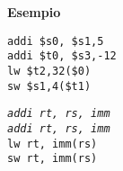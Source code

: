 \documentclass[../main.tex]{subfiles}
\begin{document}
\vspace*{5mm}
\noindent
\textbf{Esempio}
\begin{table}[h!]
    \begin{minipage}{.3\linewidth}
        \texttt{addi \$s0, \$s1,5} \\
        \texttt{addi \$t0, \$s3,-12} \\
        \newline
        \texttt{lw \$t2,32(\$0)} \\
        \texttt{sw \$s1,4(\$t1)} \\
    \end{minipage}
    \begin{minipage}{.3\linewidth}
        \textit{\texttt{addi rt, rs, imm}} \\
        \textit{\texttt{addi rt, rs, imm}} \\
        \newline
        \texttt{lw rt, imm(rs)} \\
        \texttt{sw rt, imm(rs)} \\
    \end{minipage}
\end{table}
\end{document}

